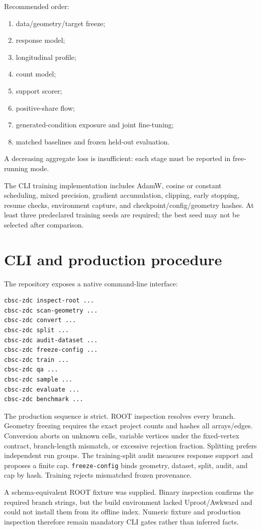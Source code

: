 \documentclass[10pt,a4paper]{article}
\begin{document}
Recommended order:
\begin{enumerate}
\item data/geometry/target freeze;
\item response model;
\item longitudinal profile;
\item count model;
\item support scorer;
\item positive-share flow;
\item generated-condition exposure and joint fine-tuning;
\item matched baselines and frozen held-out evaluation.
\end{enumerate}
A decreasing aggregate loss is insufficient: each stage must be reported in free-running mode.

The CLI training implementation includes AdamW, cosine or constant scheduling, mixed precision, gradient accumulation, clipping, early stopping, resume checks, environment capture, and checkpoint/config/geometry hashes. At least three predeclared training seeds are required; the best seed may not be selected after comparison.

\section{CLI and production procedure}

The repository exposes a native command-line interface:
\begin{lstlisting}
cbsc-zdc inspect-root ...
cbsc-zdc scan-geometry ...
cbsc-zdc convert ...
cbsc-zdc split ...
cbsc-zdc audit-dataset ...
cbsc-zdc freeze-config ...
cbsc-zdc train ...
cbsc-zdc qa ...
cbsc-zdc sample ...
cbsc-zdc evaluate ...
cbsc-zdc benchmark ...
\end{lstlisting}

The production sequence is strict. ROOT inspection resolves every branch. Geometry freezing requires the exact project counts and hashes all arrays/edges. Conversion aborts on unknown cells, variable vertices under the fixed-vertex contract, branch-length mismatch, or excessive rejection fraction. Splitting prefers independent run groups. The training-split audit measures response support and proposes a finite cap. \texttt{freeze-config} binds geometry, dataset, split, audit, and cap by hash. Training rejects mismatched frozen provenance.

A schema-equivalent ROOT fixture was supplied. Binary inspection confirms the required branch strings, but the build environment lacked Uproot/Awkward and could not install them from its offline index. Numeric fixture and production inspection therefore remain mandatory CLI gates rather than inferred facts.
\end{document}
